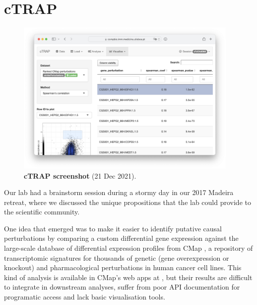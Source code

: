 
\chapter{cTRAP}
\label{chap:ctrap}

\begin{figure}[!b]
  \vspace*{-1cm}
  \includegraphics[width=0.96\textwidth]{images/cTRAP/screenshot}
  \centering
  \vspace*{-.5cm}
  \caption[cTRAP screenshot]{\textbf{cTRAP screenshot} (21 Dec 2021).}
  \label{fig:cTRAP-screenshot}
\end{figure}

Our lab had a brainstorm session during a stormy day in our 2017 Madeira retreat, where we discussed the unique propositions that the lab could provide to the scientific community.

One idea that emerged was to make it easier to identify putative causal perturbations by comparing a custom differential gene expression against the large-scale database of differential expression profiles from CMap \cite{subramanian:2017ul}, a repository of transcriptomic signatures for thousands of genetic (gene overexpression or knockout) and pharmacological perturbations in human cancer cell lines. This kind of analysis is available in CMap's web apps at  \cite{subramanian:2017ul}, but their results are difficult to integrate in downstream analyses, suffer from poor API documentation for programatic access and lack basic visualisation tools.

